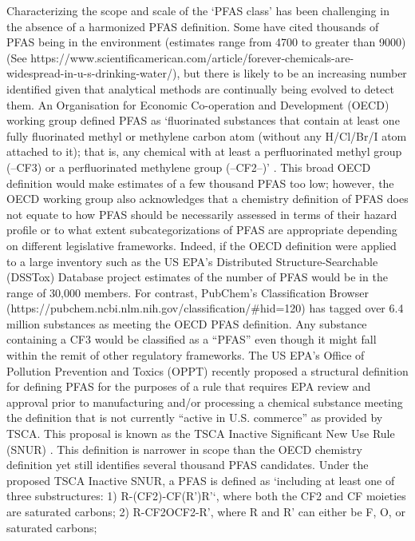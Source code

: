 \documentclass[
  super,
  preprint,
  3p]{elsarticle}
\begin{document}
Characterizing the scope and scale of the `PFAS class' has been
challenging in the absence of a harmonized PFAS definition. Some have
cited thousands of PFAS being in the environment (estimates range from
4700 to greater than 9000) (See
https://www.scientificamerican.com/article/forever-chemicals-are-widespread-in-u-s-drinking-water/),
but there is likely to be an increasing number identified given that
analytical methods are continually being evolved to detect them. An
Organisation for Economic Co-operation and Development (OECD) working
group defined PFAS as `fluorinated substances that contain at least one
fully fluorinated methyl or methylene carbon atom (without any H/Cl/Br/I
atom attached to it); that is, any chemical with at least a
perfluorinated methyl group (--CF3) or a perfluorinated methylene group
(--CF2--)' \citep{oecd_reconciling_2021, wang_new_2021}. This broad OECD
definition would make estimates of a few thousand PFAS too low; however,
the OECD working group also acknowledges that a chemistry definition of
PFAS does not equate to how PFAS should be necessarily assessed in terms
of their hazard profile or to what extent subcategorizations of PFAS are
appropriate depending on different legislative frameworks. Indeed, if
the OECD definition were applied to a large inventory such as the US
EPA's Distributed Structure-Searchable (DSSTox) Database project
\citep{grulke_epas_2019} estimates of the number of PFAS would be in the
range of 30,000 members. For contrast, PubChem's Classification Browser
(https://pubchem.ncbi.nlm.nih.gov/classification/\#hid=120) has tagged
over 6.4 million substances as meeting the OECD PFAS definition. Any
substance containing a CF3 would be classified as a ``PFAS'' even though
it might fall within the remit of other regulatory frameworks. The US
EPA's Office of Pollution Prevention and Toxics (OPPT) recently proposed
a structural definition for defining PFAS for the purposes of a rule
that requires EPA review and approval prior to manufacturing and/or
processing a chemical substance meeting the definition that is not
currently ``active in U.S. commerce'' as provided by TSCA. This proposal
is known as the TSCA Inactive Significant New Use Rule (SNUR)
\citep{epa_2023}. This definition is narrower in scope than the OECD
chemistry definition yet still identifies several thousand PFAS
candidates. Under the proposed TSCA Inactive SNUR, a PFAS is defined as
`including at least one of three substructures: 1) R-(CF2)-CF(R')R'`,
where both the CF2 and CF moieties are saturated carbons; 2)
R-CF2OCF2-R', where R and R' can either be F, O, or saturated carbons;
\end{document}
